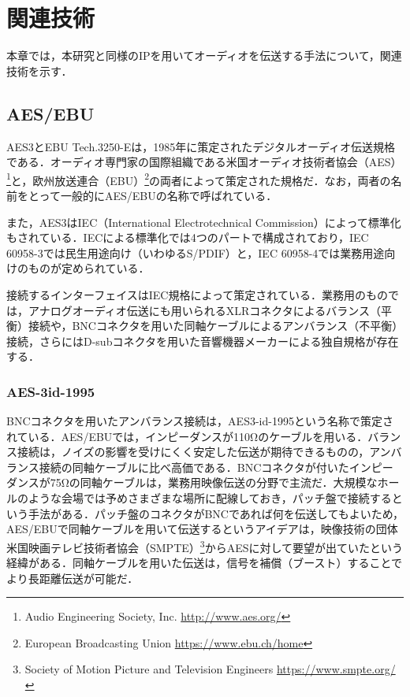 \chapter{関連技術}
\label{chap:related_works}

本章では，本研究と同様のIPを用いてオーディオを伝送する手法について，関連技術を示す．

\section{AES/EBU}

AES3\cite{aes3-1992}とEBU Tech.3250-E\cite{ebutech-3250-e}は，1985年に策定されたデジタルオーディオ伝送規格である．オーディオ専門家の国際組織である米国オーディオ技術者協会（AES）\footnote{Audio Engineering Society, Inc. \url{http://www.aes.org/}}と，欧州放送連合（EBU）\footnote{European Broadcasting Union \url{https://www.ebu.ch/home}}の両者によって策定された規格だ．なお，両者の名前をとって一般的にAES/EBUの名称で呼ばれている．

また，AES3はIEC（International Electrotechnical Commission）によって標準化もされている．IECによる標準化では4つのパートで構成されており，IEC 60958-3では民生用途向け（いわゆるS/PDIF）と，IEC 60958-4では業務用途向けのものが定められている．

接続するインターフェイスはIEC規格によって策定されている．業務用のものでは，アナログオーディオ伝送にも用いられるXLRコネクタによるバランス（平衡）接続や，BNCコネクタを用いた同軸ケーブルによるアンバランス（不平衡）接続，さらにはD-subコネクタを用いた音響機器メーカーによる独自規格が存在する．

\subsection{AES-3id-1995}

BNCコネクタを用いたアンバランス接続は，AES3-id-1995という名称で策定されている．AES/EBUでは，インピーダンスが110Ωのケーブルを用いる．バランス接続は，ノイズの影響を受けにくく安定した伝送が期待できるものの，アンバランス接続の同軸ケーブルに比べ高価である．BNCコネクタが付いたインピーダンスが75Ωの同軸ケーブルは，業務用映像伝送の分野で主流だ．大規模なホールのような会場では予めさまざまな場所に配線しておき，パッチ盤で接続するという手法がある．パッチ盤のコネクタがBNCであれば何を伝送してもよいため，AES/EBUで同軸ケーブルを用いて伝送するというアイデアは，映像技術の団体米国映画テレビ技術者協会（SMPTE）\footnote{Society of Motion Picture and Television Engineers \url{https://www.smpte.org/}}からAESに対して要望が出ていたという経緯がある\cite{aes3id-1995-column}．同軸ケーブルを用いた伝送は，信号を補償（ブースト）することでより長距離伝送が可能だ．

